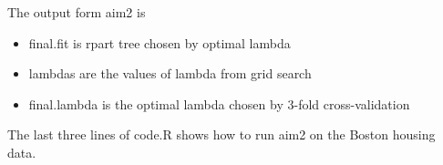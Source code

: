 \documentclass[12pt]{article}
\begin{document}
The output form aim2 is
\begin{itemize}
\item final.fit is rpart tree chosen by optimal lambda
\item lambdas are the values of lambda from grid search
\item final.lambda is the optimal lambda chosen by 3-fold cross-validation
\end{itemize}

The last three lines of code.R shows how to run aim2 on the Boston
housing data.
\end{document}
